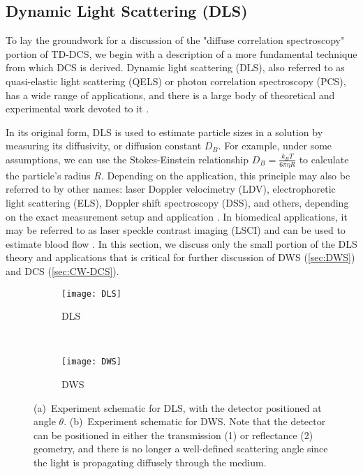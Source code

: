 \subsection{Dynamic Light Scattering (DLS)} \label{sec:DLS}
To lay the groundwork for a discussion of the "diffuse correlation spectroscopy" portion of TD-DCS, we begin with a description of a more fundamental technique from which DCS is derived. Dynamic light scattering (DLS), also referred to as quasi-elastic light scattering (QELS) or photon correlation spectroscopy (PCS), has a wide range of applications, and there is a large body of theoretical and experimental work devoted to it \cite{Schmitz1990, Pecora1985, BernePecora1976, Brown1993}.  

In its original form, DLS is used to estimate particle sizes in a solution by measuring its diffusivity, or diffusion constant $D_B$. For example, under some assumptions, we can use the Stokes-Einstein relationship $D_B = \frac{k_B T}{6\pi\eta R}$ to calculate the particle's radius $R$. Depending on the application, this principle may also be referred to by other names: laser Doppler velocimetry (LDV), electrophoretic light scattering (ELS), Doppler shift spectroscopy (DSS), and others, depending on the exact measurement setup and application \cite[ch. 1.4]{Schmitz1990}. In biomedical applications, it may be referred to as laser speckle contrast imaging (LSCI) and can be used to estimate blood flow \cite[ch. 5]{Madsen2013}. In this section, we discuss only the small portion of the DLS theory and applications that is critical for further discussion of DWS (\autoref{sec:DWS}) and DCS (\autoref{sec:CW-DCS}).

\begin{figure}[tb]
    \centering
    \begin{subfigure}[t]{0.49\textwidth}
        \centering
        \texttt{[image: DLS]}
        \caption{DLS}
        \label{fig:DLS_setup}
    \end{subfigure}~%
    \begin{subfigure}[t]{0.49\textwidth}
        \centering
        \texttt{[image: DWS]}
        \caption{DWS}
        \label{fig:DWS_setup}        
    \end{subfigure}  
    \caption{(a)~Experiment schematic for DLS, with the detector positioned at angle $\theta$. (b)~Experiment schematic for DWS. Note that the detector can be positioned in either the transmission (1) or reflectance (2) geometry, and there is no longer a well-defined scattering angle since the light is propagating diffusely through the medium.}  
\end{figure}


